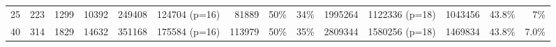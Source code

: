 \begin{table*}[t]
\begin{tabular}{|rrrrrrrrrrrrrr|}
    25 & 223 & 1299 & 10392 & 249408 & 124704 (p=16) & 81889 & 50\%& 34\%& 1995264 & 1122336 (p=18)& 1043456 & 43.8\%& 7\% \\
    
    40 & 314 & 1829& 14632& 351168& 175584 (p=16)& 113979& 50\%& 35\%& 2809344& 1580256 (p=18)& 1469834& 43.8\%& 7.0\% \\
    
    \hline
  \end{tabular}
\end{table*}